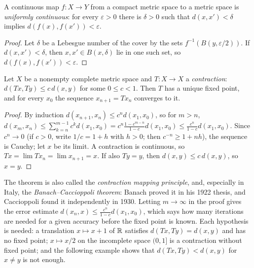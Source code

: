 \begin{corollary}\label{general-topology:corollary-uniform-continuity}
A continuous map $f \colon X \to Y$ from a compact metric space to a metric space is \emph{uniformly continuous}: for every $\varepsilon > 0$ there is
$\delta > 0$ such that $d(x, x') < \delta$ implies $d(f(x), f(x')) < \varepsilon$.
\end{corollary}

\begin{proof}
Let $\delta$ be a Lebesgue number of the cover by the sets $f^{-1}(B(y, \varepsilon/2))$. If $d(x, x') < \delta$, then $x, x' \in B(x, \delta)$ lie in one such
set, so $d(f(x), f(x')) < \varepsilon$.
\end{proof}

\begin{theorem}\label{general-topology:theorem-banach-fixed-point}
Let $X$ be a nonempty complete metric space and $T \colon X \to X$ a \emph{contraction}: $d(Tx, Ty) \leq c\,d(x, y)$ for some $0 \leq c < 1$. Then $T$ has a
unique fixed point, and for every $x_0$ the sequence $x_{n+1} = Tx_n$ converges to it.
\end{theorem}

\begin{proof}
By induction $d(x_{n+1}, x_n) \leq c^n d(x_1, x_0)$, so for $m > n$,
$d(x_m, x_n) \leq \sum_{k=n}^{m-1} c^k d(x_1, x_0) = c^n\frac{1 - c^{m-n}}{1 - c}d(x_1, x_0) \leq \frac{c^n}{1 - c}d(x_1, x_0)$. Since $c^n \to 0$ (if
$c > 0$, write $1/c = 1 + h$ with $h > 0$; then $c^{-n} \geq 1 + nh$), the sequence is Cauchy; let $x$ be its limit. A contraction is continuous, so
$Tx = \lim Tx_n = \lim x_{n+1} = x$. If also $Ty = y$, then $d(x, y) \leq c\,d(x, y)$, so $x = y$.
\end{proof}

The theorem is also called the \emph{contraction mapping principle}, and, especially in Italy, the \emph{Banach--Caccioppoli theorem}: Banach proved it in his 1922 thesis, and Caccioppoli found it
independently in 1930. Letting $m \to \infty$ in the proof gives the error estimate $d(x_n, x) \leq \frac{c^n}{1 - c}d(x_1, x_0)$, which says how many iterations are needed for a given accuracy
before the fixed point is known. Each hypothesis is needed: a translation $x \mapsto x + 1$ of $\mathbb{R}$ satisfies $d(Tx, Ty) = d(x, y)$ and has no fixed point; $x \mapsto x/2$ on the incomplete space
$(0, 1]$ is a contraction without fixed point; and the following example shows that $d(Tx, Ty) < d(x, y)$ for $x \neq y$ is not enough.

